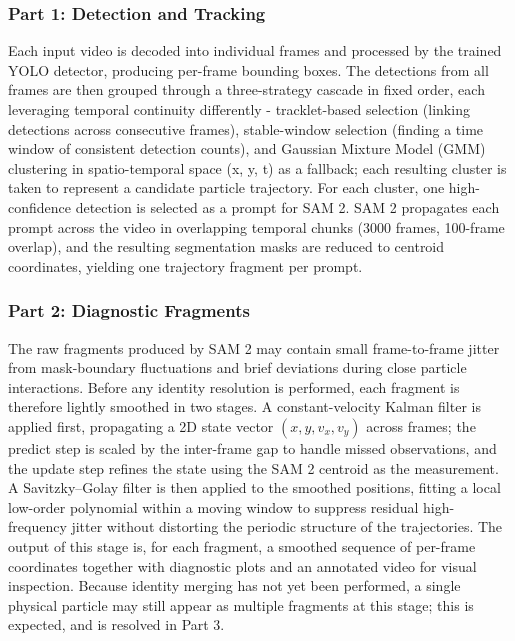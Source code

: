 \documentclass[conference]{IEEEtran}
\begin{document}
\subsubsection{\textbf{Part 1: Detection and Tracking}}
Each input video is decoded into individual frames and processed by the trained YOLO detector, producing per-frame bounding boxes. The detections from all frames are then grouped through a three-strategy cascade in fixed order, each leveraging temporal continuity differently - tracklet-based selection (linking detections across consecutive frames), stable-window selection (finding a time window of consistent detection counts), and Gaussian Mixture Model (GMM) clustering in spatio-temporal space (x, y, t) \cite{wan2019_gmm_classification} as a fallback; each resulting cluster is taken to represent a candidate particle trajectory. For each cluster, one high-confidence detection is selected as a prompt for SAM 2. SAM 2 propagates each prompt across the video in overlapping temporal chunks (3000 frames, 100-frame overlap), and the resulting segmentation masks are reduced to centroid coordinates, yielding one trajectory fragment per prompt.

\subsubsection{\textbf{Part 2: Diagnostic Fragments}}
The raw fragments produced by SAM 2 may contain small frame-to-frame jitter from mask-boundary fluctuations and brief deviations during close particle interactions. Before any identity resolution is performed, each fragment is therefore lightly smoothed in two stages. A constant-velocity Kalman filter is applied first, propagating a 2D state vector $(x, y, v_x, v_y)$ across frames; the predict step is scaled by the inter-frame gap to handle missed observations, and the update step refines the state using the SAM 2 centroid as the measurement. A Savitzky–Golay filter \cite{liu2016applications} is then applied to the smoothed positions, fitting a local low-order polynomial within a moving window to suppress residual high-frequency jitter without distorting the periodic structure of the trajectories.
The output of this stage is, for each fragment, a smoothed sequence of per-frame coordinates together with diagnostic plots and an annotated video for visual inspection. Because identity merging has not yet been performed, a single physical particle may still appear as multiple fragments at this stage; this is expected, and is resolved in Part 3.
\end{document}
